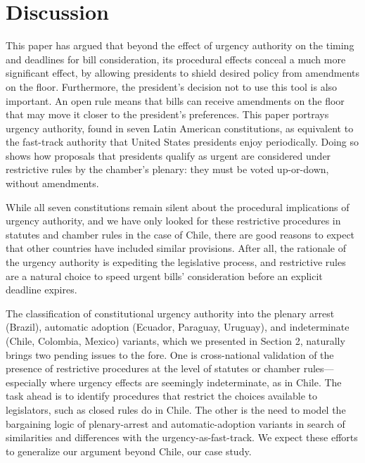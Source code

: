 \documentclass[letter,12pt]{article}
\begin{document}
\section{Discussion}\label{s:discussion}

This paper has argued that beyond the effect of urgency authority on the timing and deadlines for bill consideration, its procedural effects conceal a much more significant effect, by allowing presidents to shield desired policy from amendments on the floor. Furthermore, the president's decision not to use this tool is also important. An open rule means that bills can receive amendments on the floor that may move it closer to the president's preferences. This paper portrays urgency authority, found in seven Latin American constitutions, as equivalent to the fast-track authority that United States presidents enjoy periodically. Doing so shows how proposals that presidents qualify as urgent are considered under restrictive rules by the chamber's plenary: they must be voted up-or-down, without amendments.

While all seven constitutions remain silent about the procedural implications of urgency authority, and we have only looked for these restrictive procedures in statutes and chamber rules in the case of Chile, there are good reasons to expect that other countries have included similar provisions. After all, the rationale of the urgency authority is expediting the legislative process, and restrictive rules are a natural choice to speed urgent bills' consideration before an explicit deadline expires. 

The classification of constitutional urgency authority into the plenary arrest (Brazil), automatic adoption (Ecuador, Paraguay, Uruguay), and indeterminate (Chile, Colombia, Mexico) variants, which we presented in Section 2, naturally brings two pending issues to the fore. One is cross-national validation of the presence of restrictive procedures at the level of statutes or chamber rules---especially where urgency effects are seemingly indeterminate, as in Chile. The task ahead is to identify procedures that restrict the choices available to legislators, such as closed rules do in Chile. The other is the need to model the bargaining logic of plenary-arrest and automatic-adoption variants in search of similarities and differences with the urgency-as-fast-track. We expect these efforts to generalize our argument beyond Chile, our case study. %
\end{document}
